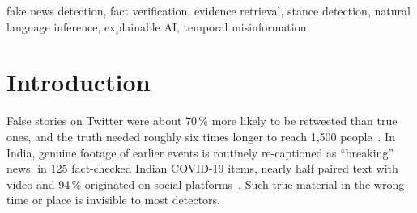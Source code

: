 \documentclass[conference]{IEEEtran}
\newcommand{\cls}[1]{\textsc{#1}}          %
\begin{document}
\begin{abstract}
Most ``fake news'' detectors are binary text classifiers that learn how fabricated articles are written, not whether their claims are true; they cannot explain a verdict, describe partly wrong or outdated items, or abstain. We present an open-source pipeline that runs on a student laptop. It extracts check-worthy claims, retrieves evidence from free web sources and an offline index of fact-checked statements, labels the stance of every passage with an NLI cross-encoder, checks dates for old news presented as new, and fuses these signals with transparent rules into one of five verdicts---\cls{Real}, \cls{Fake}, \cls{Partially True}, \cls{Misleading} or \cls{Unverifiable}---with a confidence score, dated evidence and an explanation. A fine-tuned DistilBERT style classifier reaches 0.9898 test macro-F1 on WELFake but may only adjust the confidence, because TF-IDF classifiers lose 0.29--0.44 macro-F1 when moved to a disjoint corpus. On 65 held-out fact-checked claims from 2025--26 the full system reaches a five-class macro-F1 of 0.1667 online and 0.0343 offline, far below our 0.55 target, mainly because it abstains too often. We also show that an earlier run leaked each claim's own fact-check page into the evidence, which inflated macro-F1 from 0.1260 to 0.1854. Code, data splits and claim sets are released.
\end{abstract}

\begin{IEEEkeywords}
fake news detection, fact verification, evidence retrieval, stance detection, natural language inference, explainable AI, temporal misinformation
\end{IEEEkeywords}

\section{Introduction}

False stories on Twitter were about 70\,\% more likely to be retweeted than true ones, and the truth needed roughly six times longer to reach 1{,}500 people~\cite{vosoughi2018spread}. In India, genuine footage of earlier events is routinely re-captioned as ``breaking'' news; in 125 fact-checked Indian COVID-19 items, nearly half paired text with video and 94\,\% originated on social platforms~\cite{alzaman2021india}. Such true material in the wrong time or place is invisible to most detectors.
\end{document}
